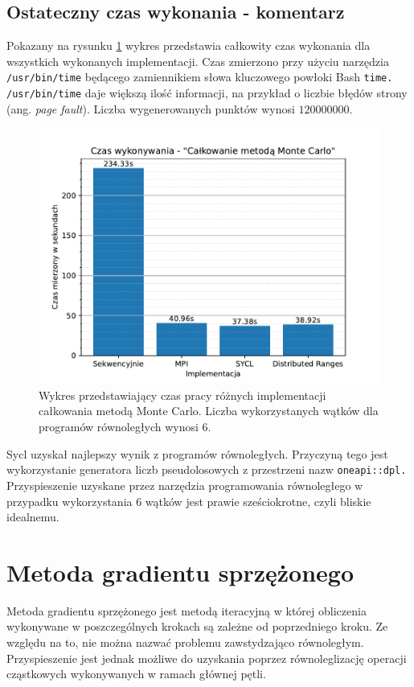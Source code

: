 \documentclass[a4paper,12pt]{book} %
\begin{document}
\subsection{Ostateczny czas wykonania - komentarz}
Pokazany na rysunku \ref{fig:wykonanie-MC} wykres przedstawia całkowity czas wykonania dla wszystkich wykonanych implementacji. Czas zmierzono przy użyciu narzędzia \texttt{/usr/bin/time} będącego zamiennikiem słowa kluczowego powłoki Bash \texttt{time.} \texttt{/usr/bin/time} daje większą ilość informacji, na przykład o liczbie błędów strony (ang. \emph{page fault}). Liczba wygenerowanych punktów wynosi $120000000.$

\begin{figure}
	\centering
	\includegraphics[scale=1]{assets/czas_wykonania_calkowanie.pdf}
	\caption{Wykres przedstawiający czas pracy różnych implementacji całkowania metodą Monte Carlo. Liczba wykorzystanych wątków dla programów równoległych wynosi 6.}
	\label{fig:wykonanie-MC}
\end{figure}

Sycl uzyskał najlepszy wynik z programów równoległych. Przyczyną tego jest wykorzystanie generatora liczb pseudolosowych z przestrzeni nazw \texttt{oneapi::dpl.} Przyspieszenie uzyskane przez narzędzia programowania równoległego w przypadku wykorzystania 6 wątków jest prawie sześciokrotne, czyli bliskie idealnemu.

\section{Metoda gradientu sprzężonego}
Metoda gradientu sprzężonego jest metodą iteracyjną w której obliczenia wykonywane w poszczególnych krokach są zależne od poprzedniego kroku. Ze względu na to, nie można nazwać problemu zawstydzająco równoległym. Przyspieszenie jest jednak możliwe do uzyskania poprzez równoleglizację operacji cząstkowych wykonywanych w ramach głównej pętli.
\end{document}
